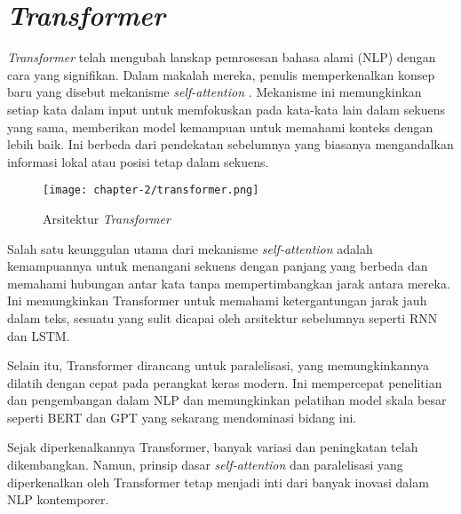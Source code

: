 \section{\textit{Transformer}}

\textit{Transformer} telah mengubah lanskap pemrosesan bahasa alami (NLP) dengan cara yang signifikan. Dalam makalah mereka, penulis memperkenalkan konsep baru yang disebut mekanisme \textit{self-attention} \parencite{transformers}. Mekanisme ini memungkinkan setiap kata dalam input untuk memfokuskan pada kata-kata lain dalam sekuens yang sama, memberikan model kemampuan untuk memahami konteks dengan lebih baik. Ini berbeda dari pendekatan sebelumnya yang biasanya mengandalkan informasi lokal atau posisi tetap dalam sekuens.

\begin{figure}[ht]
    \centering
    \texttt{[image: chapter-2/transformer.png]}
    \caption{Arsitektur \textit{Transformer} \parencite{transformers}}
    \label{fig:transformer}
\end{figure}

Salah satu keunggulan utama dari mekanisme \textit{self-attention} adalah kemampuannya untuk menangani sekuens dengan panjang yang berbeda dan memahami hubungan antar kata tanpa mempertimbangkan jarak antara mereka. Ini memungkinkan Transformer untuk memahami ketergantungan jarak jauh dalam teks, sesuatu yang sulit dicapai oleh arsitektur sebelumnya seperti RNN dan LSTM.

Selain itu, Transformer dirancang untuk paralelisasi, yang memungkinkannya dilatih dengan cepat pada perangkat keras modern. Ini mempercepat penelitian dan pengembangan dalam NLP dan memungkinkan pelatihan model skala besar seperti BERT dan GPT yang sekarang mendominasi bidang ini.

Sejak diperkenalkannya Transformer, banyak variasi dan peningkatan telah dikembangkan. Namun, prinsip dasar \textit{self-attention} dan paralelisasi yang diperkenalkan oleh Transformer tetap menjadi inti dari banyak inovasi dalam NLP kontemporer.